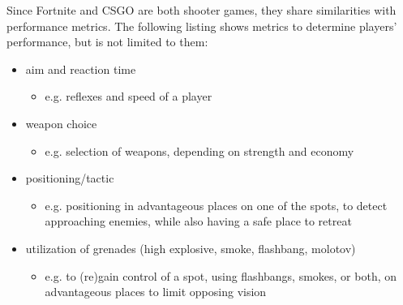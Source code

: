 Since Fortnite and CSGO are both shooter games, they share similarities with performance metrics. The following listing shows metrics to determine players' performance, but is not limited to them:
\begin{itemize}
	\item aim and reaction time
		\begin{itemize}
			\item e.g. reflexes and speed of a player
		\end{itemize}
	\item weapon choice
		\begin{itemize}
			\item e.g. selection of weapons, depending on strength and economy
		\end{itemize}
	\item positioning/tactic
		\begin{itemize}
			\item e.g. positioning in advantageous places on one of the spots, to detect approaching enemies, while also having a safe place to retreat
		\end{itemize}
	\item utilization of grenades (high explosive, smoke, flashbang, molotov)
		\begin{itemize}
			\item e.g. to (re)gain control of a spot, using flashbangs, smokes, or both, on advantageous places to limit opposing vision
		\end{itemize}
\end{itemize}